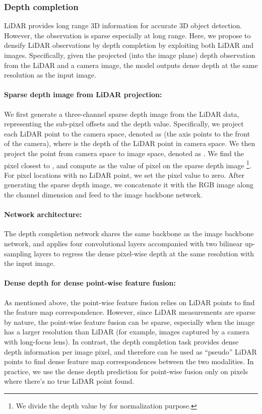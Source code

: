 \documentclass[10pt,twocolumn,letterpaper]{article}
\begin{document}
\subsubsection{Depth completion}
LiDAR provides long range 3D information for accurate 3D object detection. However, the observation is  sparse especially at long range. Here, we propose to densify LiDAR observations by depth completion by exploiting both LiDAR and  images. Specifically, 
given the projected (into the image plane) depth observation from the LiDAR and a camera image, the model outputs
dense depth at the same resolution as the input image.

\paragraph{Sparse depth image from LiDAR projection:}
We first generate a three-channel sparse depth image from the LiDAR data, representing the sub-pixel offsets and the depth value. Specifically, we  project each LiDAR point  to the camera space, denoted as  (the  axis points to the front of the camera), where  is the depth of the LiDAR point in camera space. We then project the point from camera space to image space, denoted as . We find the pixel  closest to , and compute  as the value of pixel  on the sparse depth image \footnote{We divide the depth value by  for normalization purpose.}. 
For pixel locations with no LiDAR point, we set the pixel value to zero. After generating the sparse depth image, we concatenate it with the RGB image along the channel dimension and feed to the image backbone network.

\paragraph{Network architecture:}
The depth completion network shares the same backbone as the image backbone network, and applies four convolutional layers accompanied with two bilinear up-sampling layers to regress the dense pixel-wise depth at the same resolution with the input image.

\paragraph{Dense depth for dense point-wise feature fusion:}
As mentioned above, the point-wise feature fusion relies on LiDAR points to find the feature map correspondence. However, since LiDAR measurements are sparse by nature, the point-wise feature fusion can be sparse, especially when the image has a larger resolution than LiDAR (for example, images captured by a camera with long-focus lens). In contrast, the depth completion task provides dense depth information per image pixel, and therefore can be used as ``pseudo'' LiDAR points to find dense feature map correspondences between the two modalities. In practice, we use the dense depth prediction for point-wise fusion only on pixels where there's no true LiDAR point found. 
\end{document}
